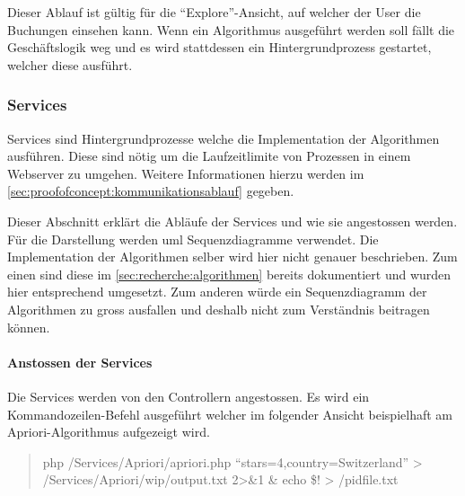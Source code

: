 Dieser Ablauf ist gültig für die "`Explore"'-Ansicht, auf welcher der User die Buchungen einsehen kann. Wenn ein Algorithmus ausgeführt werden soll fällt die Geschäftslogik weg und es wird stattdessen ein Hintergrundprozess gestartet, welcher diese ausführt.

\subsubsection{Services}
\label{sec:proofofconcept:architektur:services}
Services sind Hintergrundprozesse welche die Implementation der Algorithmen ausführen. Diese sind nötig um die Laufzeitlimite von Prozessen in einem Webserver zu umgehen. Weitere Informationen hierzu werden im \cref{sec:proofofconcept:kommunikationsablauf} gegeben.

Dieser Abschnitt erklärt die Abläufe der Services und wie sie angestossen werden. Für die Darstellung werden \gls{uml} Sequenzdiagramme verwendet. Die Implementation der Algorithmen selber wird hier nicht genauer beschrieben. Zum einen sind diese im \cref{sec:recherche:algorithmen} bereits dokumentiert und wurden hier entsprechend umgesetzt. Zum anderen würde ein Sequenzdiagramm der Algorithmen zu gross ausfallen und deshalb nicht zum Verständnis beitragen können.


\paragraph{Anstossen der Services}
Die Services werden von den Controllern angestossen. Es wird ein Kommandozeilen-Befehl ausgeführt welcher im folgender Ansicht beispielhaft am Apriori-Algorithmus aufgezeigt wird.

\blockquote[]{
php /Services/Apriori/apriori.php ``stars=4,country=Switzerland'' > /Services/Apriori/wip/output.txt 2>\&1 \& echo \$! > /pidfile.txt
}

